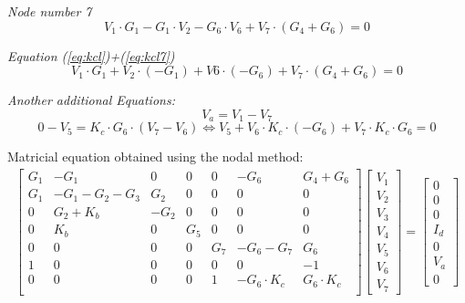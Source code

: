 \textit{Node number 7}
\begin{equation}
  V_1 \cdot G_1 - G_1 \cdot V_2 - G_6 \cdot V_6 + V_7 \cdot (G_4 + G_6)=0
  \label{eq:kcl7}
\end{equation}

\textit{Equation (\ref{eq:kcl})+(\ref{eq:kcl7})}
\begin{equation}
  V_1\cdot G_1+V_2\cdot (-G_1)+V6\cdot (-G_6)+V_7\cdot (G_4+G_6)=0
  \label{eq:kcl17}
\end{equation}

\textit{Another additional Equations:}
\begin{equation}
  V_a=V_1-V_7
  \label{eq:kcl8}
\end{equation}
\begin{equation}
  0-V_5=K_c\cdot G_6\cdot (V_7-V_6) \Leftrightarrow V_5+V_6\cdot K_c\cdot (-G_6)+V_7\cdot K_c\cdot G_6=0
  \label{eq:kcl9}
\end{equation}

Matricial equation obtained using the nodal method:
\begin{gather}
	\begin{bmatrix}
		G_1 & -G_1 & 0 & 0 & 0 & -G_6 & G_4 + G_6 \\
		G_1 & -G_1 - G_2 - G_3 & G_2 & 0 & 0 & 0 & 0 \\
		0 & G_2 + K_b & -G_2 & 0 & 0 & 0 & 0 \\
		0 & K_b & 0 & G_5 & 0 & 0 & 0 \\
		0 & 0 & 0 & 0 & G_7 & -G_6 - G_7 & G_6 \\
		1 & 0 & 0 & 0 & 0 & 0 & -1 \\
		0 & 0 & 0 & 0 & 1 & -G_6\cdot K_c & G_6\cdot K_c \\
	\end{bmatrix}
	\begin {bmatrix} V_1 \\ V_2 \\ V_3 \\ V_4  \\ V_5 \\ V_6 \\ V_7 \end{bmatrix}
	=
	\begin {bmatrix} 0  \\ 0  \\ 0  \\ I_d \\ 0  \\ V_a \\ 0 \end{bmatrix}
\end{gather}

